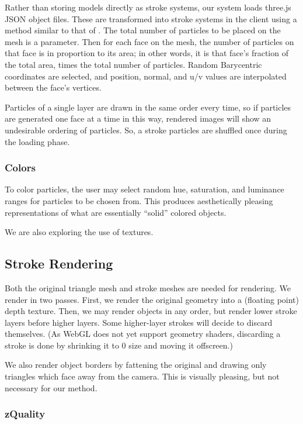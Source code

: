 \documentclass[conference]{acmsiggraph}
\begin{document}
Rather than storing models directly as stroke systems, our system loads
three.js JSON object files. These are transformed into stroke systems in the
client using a method similar to that of \cite{Meier:1996:PRA:237170.237288}.
The total number of particles to be placed on the mesh is a parameter. Then for
each face on the mesh, the number of particles on that face is in proportion to
its area; in other words, it is that face's fraction of the total area, times
the total number of particles. Random Barycentric coordinates are selected, and
position, normal, and u/v values are interpolated between the face's vertices.

Particles of a single layer are drawn in the same order every time, so if
particles are generated one face at a time in this way, rendered images will
show an undesirable ordering of particles. So, a stroke particles are shuffled
once during the loading phase.


\subsubsection{Colors}

To color particles, the user may select random hue, saturation, and luminance
ranges for particles to be chosen from. This produces aesthetically pleasing
representations of what are essentially ``solid'' colored objects.

We are also exploring the use of textures.


\subsection{Stroke Rendering}

Both the original triangle mesh and stroke meshes are needed for rendering. We
render in two passes. First, we render the original geometry into a (floating
point) depth texture. Then, we may render objects in any order, but render
lower stroke layers before higher layers. Some higher-layer strokes will decide
to discard themselves. (As WebGL does not yet support geometry shaders,
discarding a stroke is done by shrinking it to 0 size and moving it offscreen.)

We also render object borders by fattening the original and drawing only
triangles which face away from the camera. This is visually pleasing, but not
necessary for our method.


\subsubsection{zQuality}
\end{document}
